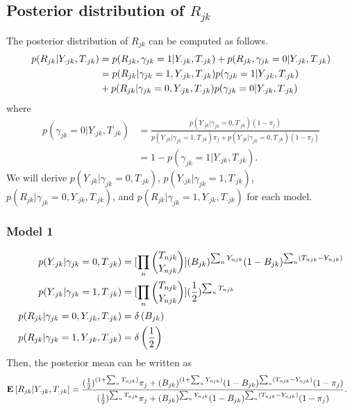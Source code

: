\documentclass[reqno]{amsart}
\numberwithin{equation}{section}
\begin{document}
\subsection{Posterior distribution of $R_{jk}$}
  
The posterior distribution of $R_{jk}$ can be computed as follows.
\begin{align}
    p(R_{jk} | Y_{\cdot jk}, T_{\cdot jk})
        &= p(R_{jk},  \gamma_{jk} = 1 | Y_{\cdot jk}, T_{\cdot jk}) + p(R_{jk},  \gamma_{jk} = 0 | Y_{\cdot jk}, T_{\cdot jk}) \\
        &= p(R_{jk}  | \gamma_{jk} =1, Y_{\cdot jk}, T_{\cdot jk})p(\gamma_{jk} =1 | Y_{\cdot jk}, T_{\cdot jk}) \notag\\
        &+ p(R_{jk} | \gamma_{jk} =0, Y_{\cdot jk}, T_{\cdot jk})p(\gamma_{jk} =0 | Y_{\cdot jk}, T_{\cdot jk})
\end{align}
where 
\begin{align}
	p(\gamma_{jk} =0 | Y_{\cdot jk}, T_{\cdot jk}) 
	&= \frac{p(Y_{\cdot jk} | \gamma_{jk} =0, T_{\cdot jk})(1-\pi_j)}{p(Y_{\cdot jk} | \gamma_{jk} =1, T_{\cdot jk})\pi_j  
    + p(Y_{\cdot jk} | \gamma_{jk} =0, T_{\cdot jk})(1-\pi_j)} \\
	&= 1- p(\gamma_{jk} =1 | Y_{\cdot jk}, T_{\cdot jk}). 
\end{align}
We will derive $p(Y_{\cdot jk} | \gamma_{jk} =0, T_{\cdot jk})$, $p(Y_{\cdot jk} | \gamma_{jk} =1, T_{\cdot jk})$, $p(R_{jk}  | \gamma_{jk} =0, Y_{\cdot jk}, T_{\cdot jk})$, and $p(R_{jk}  | \gamma_{jk} =1, Y_{\cdot jk}, T_{\cdot jk})$ for each model.


\subsubsection{Model 1}
\begin{align}
    p(Y_{\cdot jk} | \gamma_{jk} =0, T_{\cdot jk}) 
        &= [\prod_{n} {T_{njk} \choose Y_{njk}}] (B_{jk})^{\sum_{n}Y_{njk}} (1-B_{jk})^{\sum_{n}(T_{njk} - Y_{njk})}\\
    p(Y_{\cdot jk} | \gamma_{jk} =1, T_{\cdot jk})
       &= [\prod_{n} {T_{njk} \choose Y_{njk}}] (\frac{1}{2})^{\sum_{n}T_{njk}}\\
    p(R_{jk}  | \gamma_{jk} =0, Y_{\cdot jk}, T_{\cdot jk}) &=  \delta \left(B_{jk} \right)\\
    p(R_{jk}  | \gamma_{jk} =1, Y_{\cdot jk}, T_{\cdot jk}) &=  \delta \left(\frac{1}{2} \right)
\end{align}
Then, the posterior mean can be written as
\begin{align}
  \mathbf{E}_{}\left[R_{jk} | Y_{\cdot jk}, T_{\cdot jk}\right]
      &= \frac{(\frac{1}{2})^{(1+\sum_{n}T_{njk})} \pi_j 
        + (B_{jk})^{(1+\sum_{n}Y_{njk} )} (1-B_{jk})^{\sum_{n}(T_{njk} - Y_{njk})}(1-\pi_j)}{(\frac{1}{2})^{\sum_{n}T_{njk}} \pi_j 
        + (B_{jk})^{\sum_{n}Y_{njk}} (1-B_{jk})^{\sum_{n}(T_{njk} - Y_{njk})}(1-\pi_j) }.
\end{align}
\end{document}
